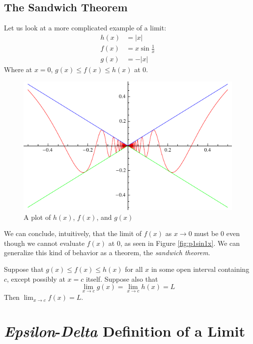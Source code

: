 \subsection{The Sandwich Theorem}

Let us look at a more complicated example of a limit:
\begin{align*}
  h(x) &= |x| \\
  f(x) &= x\sin{\frac{1}{x}}\\
  g(x) &= -|x|
\end{align*}
Where at \(x=0\), \(g(x) \leq f(x) \leq h(x)\) at 0.
\begin{figure}[H]
  \begin{center}
    \includegraphics{graphs/sandwichtheorem.pdf}
  \end{center}
  \caption{A plot of \(h(x)\), \(f(x)\), and \(g(x)\)}
\end{figure}
We can conclude, intuitively, that the limit of \(f(x)\) as \(x \to 0\) must be
0 even though we cannot evaluate \(f(x)\) at 0, as seen in Figure
\ref{fig:p1sin1x}. We can generalize this kind of behavior as a theorem, the
\emph{sandwich theorem}.
\begin{theorem}
  Suppose that \(g(x) \leq f(x) \leq h(x)\) for all \(x\) in some open interval
  containing \(c\), except possibly at \(x=c\) itself. Suppose also that
  \[ \lim_{x \to c} g(x) = \lim_{x \to c} h(x) = L \]
  Then \(\lim_{x \to c} f(x) = L\).
  \label{the:sandwich}
\end{theorem}

\section{\emph{Epsilon}-\emph{Delta} Definition of a Limit}


